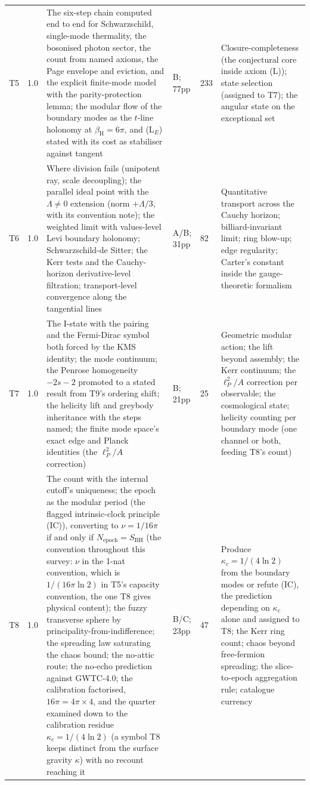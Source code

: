 \documentclass[11pt]{article}
\theoremstyle{definition}
\theoremstyle{plain}
\begin{document}
\begin{longtable}{p{} p{} p{} p{} p{} p{}}
T5 & 1.0 & The six-step chain computed end to end for Schwarzschild, single-mode thermality, the bosonised photon sector, the count from named axioms, the Page envelope and eviction, and the explicit finite-mode model with the parity-protection lemma; the modular flow of the boundary modes as the $t$-line holonomy at $\beta_{\mathrm{H}} = 6\pi$, and (L$_E$) stated with its cost as stabiliser against tangent \cite{ButlerT5} & B; 77pp & 233 & Closure-completeness (the conjectural core inside axiom (L)); state selection (assigned to T7); the angular state on the exceptional set \\
T6 & 1.0 & Where division fails (unipotent ray, scale decoupling); the parallel ideal point with the $\Lambda \neq 0$ extension (norm $+\Lambda/3$, with its convention note); the weighted limit with values-level Levi boundary holonomy; Schwarzschild-de Sitter; the Kerr tests and the Cauchy-horizon derivative-level filtration; transport-level convergence along the tangential lines \cite{ButlerT6} & A/B; 31pp & 82 & Quantitative transport across the Cauchy horizon; billiard-invariant limit; ring blow-up; edge regularity; Carter's constant inside the gauge-theoretic formalism \\
T7 & 1.0 & The I-state with the pairing and the Fermi-Dirac symbol both forced by the KMS identity; the mode continuum; the Penrose homogeneity $-2s-2$ promoted to a stated result from T9's ordering shift; the helicity lift and greybody inheritance with the steps named; the finite mode space's exact edge and Planck identities (the $\ell_{P}^{2}/A$ correction) \cite{ButlerT7} & B; 21pp & 25 & Geometric modular action; the lift beyond assembly; the Kerr continuum; the $\ell_{P}^{2}/A$ correction per observable; the cosmological state; helicity counting per boundary mode (one channel or both, feeding T8's count) \\
T8 & 1.0 & The count with the internal cutoff's uniqueness; the epoch as the modular period (the flagged intrinsic-clock principle (IC)), converting to $\nu = 1/16\pi$ if and only if $N_{\mathrm{epoch}} = S_{\mathrm{BH}}$ (the convention throughout this survey: $\nu$ in the 1-nat convention, which is $1/(16\pi\ln 2)$ in T5's capacity convention, the one T8 gives physical content); the fuzzy transverse sphere by principality-from-indifference; the spreading law saturating the chaos bound; the no-attic route; the no-echo prediction against GWTC-4.0; the calibration factorised, $16\pi = 4\pi \times 4$, and the quarter examined down to the calibration residue $\kappa_{c} = 1/(4\ln 2)$ (a symbol T8 keeps distinct from the surface gravity $\kappa$) with no recount reaching it \cite{ButlerT8} & B/C; 23pp & 47 & Produce $\kappa_{c} = 1/(4\ln 2)$ from the boundary modes or refute (IC), the prediction depending on $\kappa_{c}$ alone and assigned to T8; the Kerr ring count; chaos beyond free-fermion spreading; the slice-to-epoch aggregation rule; catalogue currency \\

\end{longtable}
\end{document}
